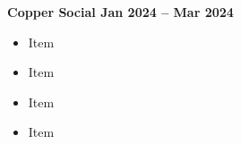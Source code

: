 \textbf{{Copper Social} \hfill Jan 2024 -- Mar 2024} \par
\begin{itemize}
	\item Item
    \item Item
    \item Item
    \item Item
\end{itemize}\vspace{0.1cm}\par
